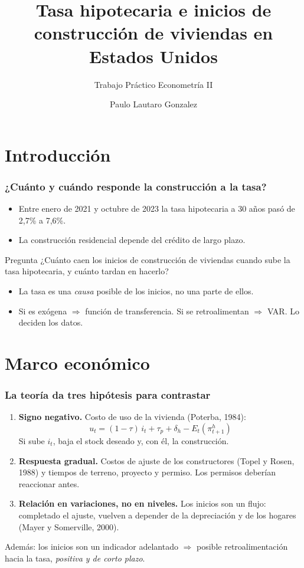 \documentclass[aspectratio=169]{beamer}
\title{Tasa hipotecaria e inicios de construcción de viviendas en Estados Unidos}
\subtitle{Trabajo Práctico Econometría II}
\author{Paulo Lautaro Gonzalez}
\institute{Facultad de Ciencias Económicas, UBA}
\date{}
\begin{document}
\begin{frame}
  \titlepage
\end{frame}

\section{Introducción}
\begin{frame}
  \frametitle{¿Cuánto y cuándo responde la construcción a la tasa?}
  \begin{itemize}
    \item Entre enero de 2021 y octubre de 2023 la tasa hipotecaria a 30 años pasó de 2,7\% a 7,6\%.
    \item La construcción residencial depende del crédito de largo plazo.
  \end{itemize}

  \begin{block}{Pregunta}
    ¿Cuánto caen los inicios de construcción de viviendas cuando sube la tasa hipotecaria, y cuánto tardan en hacerlo?
  \end{block}

  \begin{itemize}
    \item La tasa es una \emph{causa} posible de los inicios, no una parte de ellos.
    \item Si es exógena $\Rightarrow$ función de transferencia. Si se retroalimentan $\Rightarrow$ VAR. \alert{Lo deciden los datos.}
  \end{itemize}
\end{frame}

\section{Marco económico}
\begin{frame}
  \frametitle{La teoría da tres hipótesis para contrastar}
  \begin{enumerate}
    \item \textbf{Signo negativo.} Costo de uso de la vivienda (Poterba, 1984):
      \[ u_t=(1-\tau)\,i_t+\tau_p+\delta_h-E_t\left(\pi^h_{t+1}\right) \]
      Si sube $i_t$, baja el stock deseado y, con él, la construcción.
    \item \textbf{Respuesta gradual.} Costos de ajuste de los constructores (Topel y Rosen, 1988) y tiempos de terreno, proyecto y permiso. Los permisos deberían reaccionar antes.
    \item \textbf{Relación en variaciones, no en niveles.} Los inicios son un flujo: completado el ajuste, vuelven a depender de la depreciación y de los hogares (Mayer y Somerville, 2000).
  \end{enumerate}
  \medskip
  \small Además: los inicios son un indicador adelantado $\Rightarrow$ posible retroalimentación hacia la tasa, \emph{positiva y de corto plazo}.
\end{frame}
\end{document}
